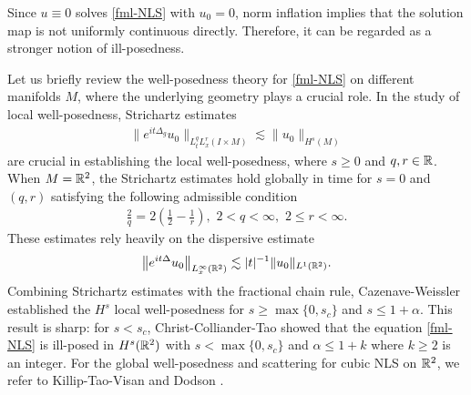 \documentclass[10pt,a4paper]{amsart}
\numberwithin{equation}{section}
\newcommand{\R}{\Bbb R}
\begin{document}
Since $u\equiv 0$ solves \eqref{fml-NLS} with $u_0=0$, norm inflation implies that the solution map is not uniformly continuous directly. Therefore, it can be regarded as a stronger notion of ill-posedness.
	
	
Let us briefly review the well-posedness theory for \eqref{fml-NLS} on different manifolds $M$, where the underlying geometry plays a crucial role. In the study of local well-posedness, Strichartz estimates  
\begin{align}\label{Strichartz}
\big\|e^{it\Delta_g}u_0\big\|_{L_t^qL_x^r(I\times M)}\lesssim \|u_0\|_{H^s(M)}
\end{align} 
are crucial in establishing the local well-posedness, where $s\geq0$ and $q,r\in\R$. When $M=\R^2$, the Strichartz estimates hold  globally in time  for $s=0$ and $(q,r)$ satisfying the following admissible condition
\begin{align}\label{admissible}
\frac{2}{q}=2\left(\frac12-\frac1r\right),\,\,2<q<\infty,\,\,2\leq  r<\infty.
\end{align}  
These estimates rely heavily on the dispersive estimate
\begin{align*}
\big\|e^{it\Delta}u_0\big\|_{L_x^\infty(\R^2)}\lesssim|t|^{-1}\|u_0\|_{L^1(\R^2)}.
\end{align*}
Combining Strichartz estimates   with the fractional chain rule, Cazenave-Weissler  \cite{Caze} established the $ H^{s}$ local well-posedness for $s\geq \max\{0,s_c\}$ and $s\leq 1+\alpha$.   This result is sharp: for $s < s_c$, Christ-Colliander-Tao \cite{CCT-03} showed that the equation \eqref{fml-NLS} is  ill-posed in $H^s(\R^2)$ with $s<\max\{0,s_c\}$ and $\alpha \leq 1+k$ where $k\geq2$ is an integer. For the global well-posedness and scattering for cubic NLS on $\R^2$, we refer to Killip-Tao-Visan \cite{KVZ-JEMS} and Dodson \cite{Dodson}.
	
\end{document}
